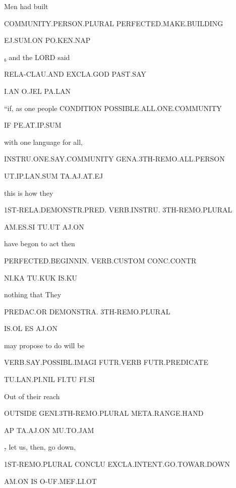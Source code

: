  

Men				had built 

COMMUNITY.PERSON.PLURAL	PERFECTED.MAKE.BUILDING 

EJ.SUM.ON			PO.KEN.NAP 

  

₆ and 			the LORD            said 

RELA-CLAU.AND              EXCLA.GOD	PAST.SAY 

I.AN			O.JEL		PA.LAN 

  

“if, 			as one people 				CONDITION	POSSIBLE.ALL.ONE.COMMUNITY		 

IF			PE.AT.IP.SUM				 

 

with one language 		for all, 

INSTRU.ONE.SAY.COMMUNITY	GENA.3TH-REMO.ALL.PERSON	 

UT.IP.LAN.SUM			TA.AJ.AT.EJ 

 

this is 				how       	they  

1ST-RELA.DEMONSTR.PRED.	VERB.INSTRU.    3TH-REMO.PLURAL 

AM.ES.SI			TU.UT		AJ.ON 

  

have begon 			to act		then 		 

PERFECTED.BEGINNIN.                 VERB.CUSTOM	CONC.CONTR	 

NI.KA				TU.KUK		IS.KU                     

nothing 	that		They 	 

PREDAC.OR	DEMONSTRA.	3TH-REMO.PLURAL 

IS.OL		ES		AJ.ON	 

 

may propose			to do		will be 

VERB.SAY.POSSIBL.IMAGI	FUTR.VERB	FUTR.PREDICATE 

TU.LAN.PI.NIL		               FI.TU		FI.SI 

  

Out 		of their 				reach 

OUTSIDE	GENI.3TH-REMO.PLURAL	META.RANGE.HAND 

AP		TA.AJ.ON			MU.TO.JAM 

  

₇ let us, then, go down, 			      	 

1ST-REMO.PLURAL CONCLU EXCLA.INTENT.GO.TOWAR.DOWN             

AM.ON	IS	 O-UF.MEF.LI.OT				 

